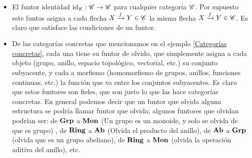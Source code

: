 \documentclass{comunicaciones}
\begin{document}
\begin{ej}
    \begin{itemize}
        \item El funtor identidad $\mathrm{id}_\mathscr C:\mathscr C\to\mathscr C$ para cualquier categoría $\mathscr C$. Por supuesto este funtos asigna a cada flecha $X\xrightarrow{f}Y\in\mathscr C$ 
        la misma flecha $X\xrightarrow{f}Y\in\mathscr C$. Es claro que satisface las condiciones de un funtor.
        \item De las categorías concretas que mencionamos en el ejemplo \ref{Categorías concretas}, cada una tiene su funtor de olvido, que simplemente 
        asigna a cada objeto (grupo, anillo, espacio topológico, vectorial, etc.) su conjunto subyacente, y cada a morfismo (homomorfismo de grupos, anillos,
        funciones continuas, etc.) la función que va entre los conjuntos subyacentes. Es claro que estos funtores son fieles, que son justo lo que las hace
        categorías concretas. En general podemos decir que un funtor que olvida alguna estructura se podría llamar funtor que olvida; algunos funtores
        que olvidan podrían ser: de $\mathbf{Grp}$ a $\mathbf{Mon}$ (Un grupo es un monoide, y solo se olvida de que es grupo) , de $\mathbf{Ring}$ a $\mathbf{Ab}$ (Olvida el producto del
        anillo), de $\mathbf{Ab}$ a $\mathbf{Grp}$ (olvida que es un grupo abeliano), de $\mathbf{Ring}$ a $\mathbf{Mon}$ (olvida la operación aditiva del anillo), etc.
    \end{itemize}
\end{ej}
\end{document}
